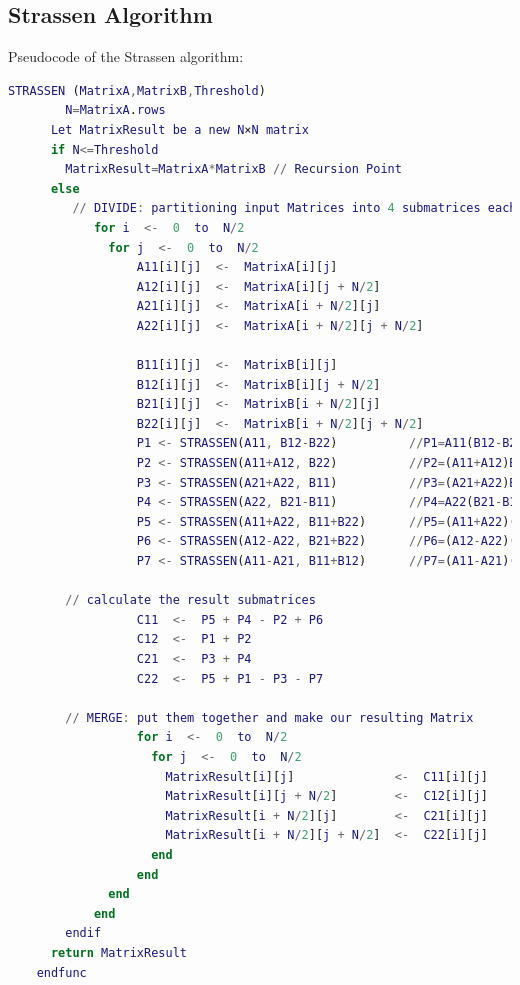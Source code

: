 \documentclass[UTF8]{ctexart}
\begin{document}
\subsection{Strassen Algorithm}
\label{subsec::STA}

Pseudocode of the Strassen algorithm:
\begin{lstlisting}[language=matlab,style=pseudocode]
    STRASSEN (MatrixA,MatrixB,Threshold)
        N=MatrixA.rows
      Let MatrixResult be a new N×N matrix
      if N<=Threshold
        MatrixResult=MatrixA*MatrixB // Recursion Point
      else
         // DIVIDE: partitioning input Matrices into 4 submatrices each
            for i  <-  0  to  N/2
              for j  <-  0  to  N/2
                  A11[i][j]  <-  MatrixA[i][j]
                  A12[i][j]  <-  MatrixA[i][j + N/2]
                  A21[i][j]  <-  MatrixA[i + N/2][j]
                  A22[i][j]  <-  MatrixA[i + N/2][j + N/2]

                  B11[i][j]  <-  MatrixB[i][j]
                  B12[i][j]  <-  MatrixB[i][j + N/2]
                  B21[i][j]  <-  MatrixB[i + N/2][j]
                  B22[i][j]  <-  MatrixB[i + N/2][j + N/2]
                  P1 <- STRASSEN(A11, B12-B22)          //P1=A11(B12-B22)
                  P2 <- STRASSEN(A11+A12, B22)          //P2=(A11+A12)B22
                  P3 <- STRASSEN(A21+A22, B11)          //P3=(A21+A22)B11
                  P4 <- STRASSEN(A22, B21-B11)          //P4=A22(B21-B11)
                  P5 <- STRASSEN(A11+A22, B11+B22)      //P5=(A11+A22)(B11+B22)
                  P6 <- STRASSEN(A12-A22, B21+B22)      //P6=(A12-A22)(B21+B22)
                  P7 <- STRASSEN(A11-A21, B11+B12)      //P7=(A11-A21)(B11+B12)

        // calculate the result submatrices
                  C11  <-  P5 + P4 - P2 + P6
                  C12  <-  P1 + P2
                  C21  <-  P3 + P4
                  C22  <-  P5 + P1 - P3 - P7

        // MERGE: put them together and make our resulting Matrix
                  for i  <-  0  to  N/2
                    for j  <-  0  to  N/2
                      MatrixResult[i][j]              <-  C11[i][j]
                      MatrixResult[i][j + N/2]        <-  C12[i][j]
                      MatrixResult[i + N/2][j]        <-  C21[i][j]
                      MatrixResult[i + N/2][j + N/2]  <-  C22[i][j]
                    end
                  end
              end
            end
        endif
      return MatrixResult
    endfunc
  \end{lstlisting}
\end{document}
